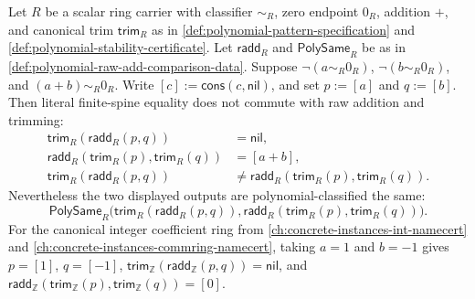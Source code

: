 \begin{proposition}
\label{prop:polynomial-literal-add-trim-equality-fails-cancelling-singletons}
Let $R$ be a scalar ring carrier with classifier $\sim_R$, zero endpoint $0_R$, addition $+$, and canonical trim $\mathsf{trim}_R$ as in \autoref{def:polynomial-pattern-specification} and \autoref{def:polynomial-stability-certificate}. Let $\mathsf{radd}_R$ and $\mathsf{PolySame}_R$ be as in \autoref{def:polynomial-raw-add-comparison-data}. Suppose $\neg(a\sim_R0_R)$, $\neg(b\sim_R0_R)$, and $(a+b)\sim_R0_R$.
Write $[c]:=\mathsf{cons}(c,\mathsf{nil})$, and set $p:=[a]$ and $q:=[b]$. Then literal finite-spine equality does not commute with raw addition and trimming:
$$
\begin{aligned}
\mathsf{trim}_R(\mathsf{radd}_R(p,q))&=\mathsf{nil},\\
\mathsf{radd}_R(\mathsf{trim}_R(p),\mathsf{trim}_R(q))&=[a+b],\\
\mathsf{trim}_R(\mathsf{radd}_R(p,q))&\ne \mathsf{radd}_R(\mathsf{trim}_R(p),\mathsf{trim}_R(q)).
\end{aligned}
$$
Nevertheless the two displayed outputs are polynomial-classified the same:
$$
\mathsf{PolySame}_R\bigl(\mathsf{trim}_R(\mathsf{radd}_R(p,q)),\mathsf{radd}_R(\mathsf{trim}_R(p),\mathsf{trim}_R(q))\bigr).
$$
For the canonical integer coefficient ring from \autoref{ch:concrete-instances-int-namecert} and \autoref{ch:concrete-instances-commring-namecert}, taking $a=1$ and $b=-1$ gives $p=[1]$, $q=[-1]$, $\mathsf{trim}_{\mathbb{Z}}(\mathsf{radd}_{\mathbb{Z}}(p,q))=\mathsf{nil}$, and $\mathsf{radd}_{\mathbb{Z}}(\mathsf{trim}_{\mathbb{Z}}(p),\mathsf{trim}_{\mathbb{Z}}(q))=[0]$.
\end{proposition}

